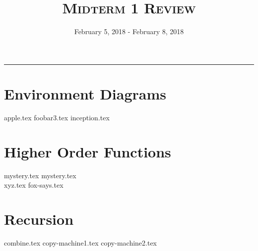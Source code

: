 \documentclass{exam}
\title{\textsc{Midterm 1 Review}}
\date{February 5, 2018 - February 8, 2018}
\begin{document}
\maketitle
\rule{\textwidth}{0.15em}
\fontsize{12}{15}\selectfont


\section{Environment Diagrams}
\begin{questions}
{apple.tex}
\newpage
{foobar3.tex}
\newpage
{inception.tex}
\end{questions}

\newpage
\section{Higher Order Functions}
\begin{questions}
{mystery.tex}
\newpage
{mystery.tex}
\\[10\baselineskip]
{xyz.tex}
\newpage
{fox-says.tex}
\end{questions}

\newpage
\section{Recursion}
\begin{questions}
{combine.tex}
{copy-machine1.tex}
{copy-machine2.tex}
\end{questions}
\end{document}
